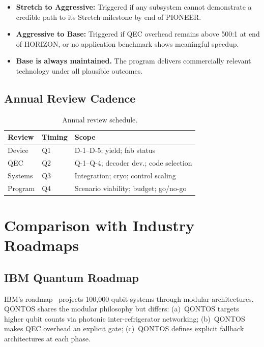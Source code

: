 \documentclass[conference]{IEEEtran}
\begin{document}
\begin{itemize}[leftmargin=*]
\item \textbf{Stretch to Aggressive:} Triggered if any subsystem cannot demonstrate a credible path to its Stretch milestone by end of PIONEER.
\item \textbf{Aggressive to Base:} Triggered if QEC overhead remains above 500:1 at end of HORIZON, or no application benchmark shows meaningful speedup.
\item \textbf{Base is always maintained.} The program delivers commercially relevant technology under all plausible outcomes.
\end{itemize}

\subsection{Annual Review Cadence}

\begin{table}[H]
\centering
\caption{Annual review schedule.}
\begin{tabular}{@{}l l L{4cm}@{}}
\toprule
\textbf{Review} & \textbf{Timing} & \textbf{Scope} \\
\midrule
Device & Q1 & D-1--D-5; yield; fab status \\
QEC & Q2 & Q-1--Q-4; decoder dev.; code selection \\
Systems & Q3 & Integration; cryo; control scaling \\
Program & Q4 & Scenario viability; budget; go/no-go \\
\bottomrule
\end{tabular}
\end{table}

\section{Comparison with Industry Roadmaps}

\subsection{IBM Quantum Roadmap}

IBM's roadmap~\cite{ibm2024} projects 100,000-qubit systems through modular architectures. QONTOS shares the modular philosophy but differs: (a)~QONTOS targets higher qubit counts via photonic inter-refrigerator networking; (b)~QONTOS makes QEC overhead an explicit gate; (c)~QONTOS defines explicit fallback architectures at each phase.
\end{document}
